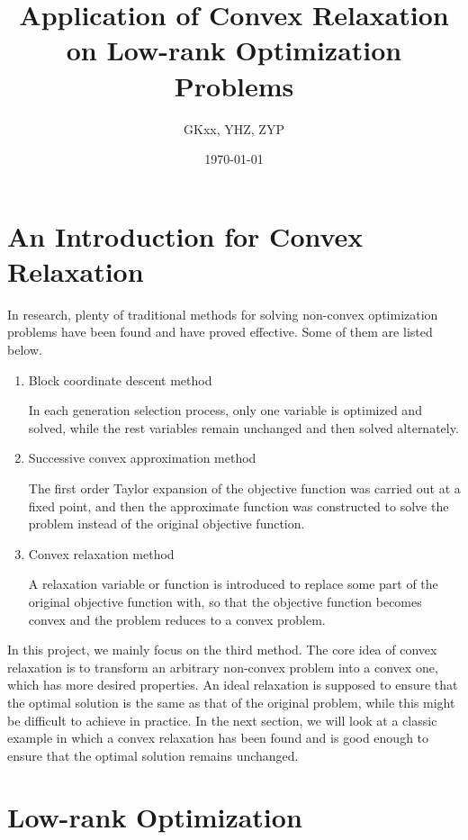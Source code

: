 \documentclass[11pt]{article}
\title{Application of Convex Relaxation on Low-rank Optimization Problems}
\author{GKxx, YHZ, ZYP}
\date{\today}
\begin{document}
\maketitle

\tableofcontents

\newpage

\section{An Introduction for Convex Relaxation}

In research, plenty of traditional methods for solving non-convex optimization problems have been found and have proved effective. Some of them are listed below.

\begin{enumerate}
    \item Block coordinate descent method\par
    In each generation selection process, only one variable is optimized and solved, while the rest variables remain unchanged and then solved alternately.
    \item Successive convex approximation method\par
    The first order Taylor expansion of the objective function was carried out at a fixed point, and then the approximate function was constructed to solve the problem instead of the original objective function.
    \item Convex relaxation method\par
    A relaxation variable or function is introduced to replace some part of the original objective function with, so that the objective function becomes convex and the problem reduces to a convex problem.
\end{enumerate}

In this project, we mainly focus on the third method. The core idea of convex relaxation is to transform an arbitrary non-convex problem into a convex one, which has more desired properties. An ideal relaxation is supposed to ensure that the optimal solution is the same as that of the original problem, while this might be difficult to achieve in practice. In the next section, we will look at a classic example in which a convex relaxation has been found and is good enough to ensure that the optimal solution remains unchanged.

\section{Low-rank Optimization}
\end{document}

